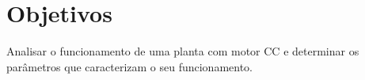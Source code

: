 \section{Objetivos}
Analisar o funcionamento de uma planta com motor CC e determinar os parâmetros que caracterizam o seu funcionamento.